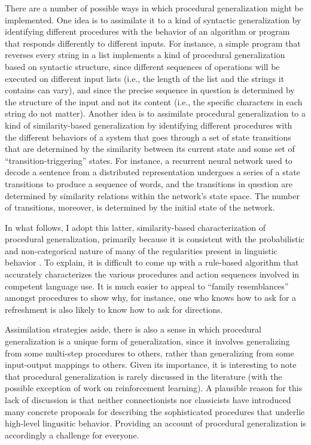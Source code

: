 There are a number of possible ways in which procedural generalization might be implemented. One idea is to assimilate it to a kind of syntactic generalization by identifying different procedures with the behavior of an algorithm or program that responds differently to different inputs. For instance, a simple program that reverses every string in a list implements a kind of procedural generalization based on syntactic structure, since different sequences of operations will be executed on different input lists (i.e., the length of the list and the strings it contains can vary), and since the precise sequence in question is determined by the structure of the input and not its content (i.e., the specific characters in each string do not matter). Another idea is to assimilate procedural generalization to a kind of similarity-based generalization by identifying different procedures with the different behaviors of a system that goes through a set of state transitions that are determined by the similarity between its current state and some set of ``transition-triggering'' states. For instance, a recurrent neural network used to decode a sentence from a distributed representation undergoes a series of a state transitions to produce a sequence of words, and the transitions in question are determined by similarity relations within the network's state space. The number of transitions, moreover, is determined by the initial state of the network.

In what follows, I adopt this latter, similarity-based characterization of procedural generalization, primarily because it is consistent with the probabilistic and non-categorical nature of many of the regularities present in linguistic behavior \citep{Seidenberg:1997,Manning:2015}. To explain, it is difficult to come up with a rule-based algorithm that accurately characterizes the various procedures and action sequences involved in competent language use. It is much easier to appeal to ``family resemblances'' amongst procedures to show why, for instance, one who knows how to ask for a refreshment is also likely to know how to ask for directions.

Assimilation strategies aside, there is also a sense in which procedural generalization is a unique form of generalization, since it involves generalizing from some multi-step procedures to others, rather than generalizing from some input-output mappings to others. Given its importance, it is interesting to note that procedural generalization is rarely discussed in the literature (with the possible exception of work on reinforcement learning\citep[e.g.][]{Mnih:2015,Eliasmith:2012}). A plausible reason for this lack of discussion is that neither connectionists nor classicists have introduced many concrete proposals for describing the sophisticated procedures that underlie high-level lingusitic behavior. Providing an account of procedural generalization is accordingly a challenge for everyone. 

